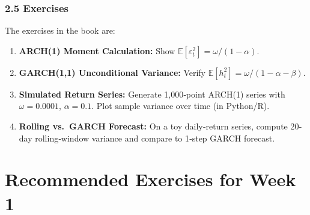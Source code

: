 \documentclass[11pt]{amsart}
\begin{document}
\subsubsection{2.5 Exercises}
The exercises in the book are:
\begin{enumerate}[noitemsep,left=0pt]
	\item \textbf{ARCH(1) Moment Calculation:} Show $\mathbb{E}[\varepsilon_t^2] = \omega/(1 - \alpha)$.
	\item \textbf{GARCH(1,1) Unconditional Variance:} Verify $\mathbb{E}[h_t^2] = \omega/(1 - \alpha - \beta)$.
	\item \textbf{Simulated Return Series:} Generate 1{,}000‐point ARCH(1) series with $\omega=0.0001$, $\alpha=0.1$. Plot sample variance over time (in Python/R).
	\item \textbf{Rolling vs.\ GARCH Forecast:} On a toy daily‐return series, compute 20‐day rolling‐window variance and compare to 1‐step GARCH forecast.
\end{enumerate}

\section{Recommended Exercises for Week 1}
\end{document}
